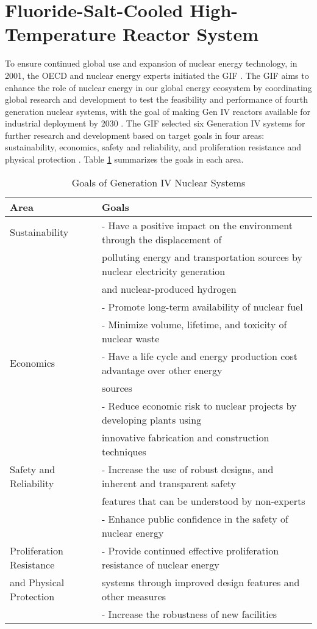 \section{Fluoride-Salt-Cooled High-Temperature Reactor System}
\label{sec:fhr}
To ensure continued global use and expansion of nuclear energy technology, in 
2001, the \gls{OECD} and nuclear energy experts initiated the \gls{GIF} 
\cite{gif_technology_2002}.
The \gls{GIF} aims to enhance the role of nuclear energy in our global energy 
ecosystem by coordinating global research and development to test the 
feasibility and performance of fourth generation nuclear systems, with the goal 
of making Gen IV reactors available for industrial deployment by 2030 
\cite{gif_technology_2002}.
The \gls{GIF} selected six Generation IV systems for further research and 
development based on target goals in four areas: sustainability, 
economics, safety and reliability, and proliferation resistance and physical 
protection \cite{gif_technology_2002}. 
Table \ref{tab:goals-gen4} summarizes the goals in each area. 
\begin{table}[btp]
    \centering
    \onehalfspacing
    \caption{Goals of Generation IV Nuclear Systems \cite{gif_technology_2002,
    behar_technology_2014}}
	\label{tab:goals-gen4}
    \footnotesize
    \begin{tabular}{l|l}
    \hline
                               \textbf{Area} & \textbf{Goals} \\ \hline
    Sustainability   & - Have a positive impact on the environment through the displacement of \\
    & polluting energy and transportation sources by nuclear electricity generation \\
    & and nuclear-produced hydrogen \\ 
    & - Promote long-term availability of nuclear fuel \\
    & - Minimize volume, lifetime, and toxicity of nuclear waste \\ \hline
    Economics & - Have a life cycle and energy production cost advantage over other energy \\
    & sources \\ 
    & - Reduce economic risk to nuclear projects by developing plants using \\
    & innovative fabrication and construction techniques \\ \hline
    Safety and Reliability   & - Increase the use of robust designs, and inherent and transparent safety\\
    & features that can be understood by non-experts \\ 
    & - Enhance public confidence in the safety of nuclear energy \\\hline
    Proliferation Resistance & - Provide continued effective proliferation resistance of nuclear energy \\
    and Physical Protection & systems through improved design features and other measures \\ 
    & - Increase the robustness of new facilities \\ \hline
    \end{tabular}
\end{table}
